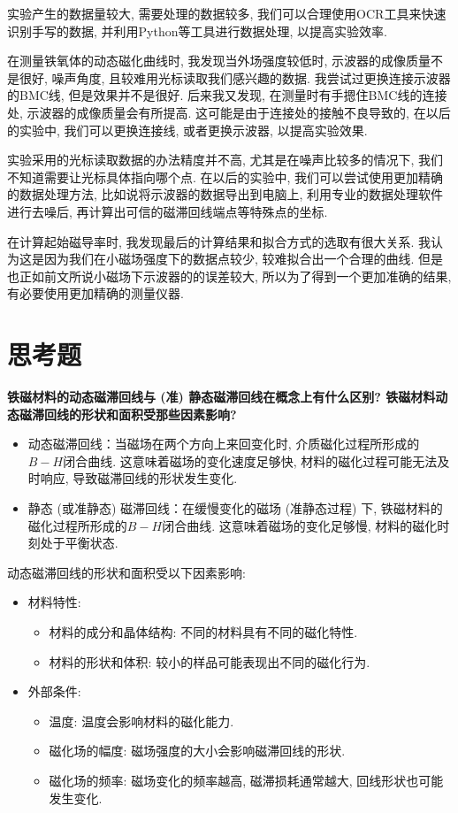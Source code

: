 \documentclass[zihao=5, UTF8]{article}
\theoremstyle{MyLineTheoremStyle} %
\theoremstyle{MyBlockTheoremStyle} %
\theoremstyle{MySubsubsectionStyle} %
\begin{document}
实验产生的数据量较大, 需要处理的数据较多, 我们可以合理使用OCR工具来快速识别手写的数据, 并利用Python等工具进行数据处理, 以提高实验效率.

在测量铁氧体的动态磁化曲线时, 我发现当外场强度较低时, 示波器的成像质量不是很好, 噪声角度, 且较难用光标读取我们感兴趣的数据. 我尝试过更换连接示波器的BMC线, 但是效果并不是很好. 后来我又发现, 在测量时有手摁住BMC线的连接处, 示波器的成像质量会有所提高. 这可能是由于连接处的接触不良导致的, 在以后的实验中, 我们可以更换连接线, 或者更换示波器, 以提高实验效果.

实验采用的光标读取数据的办法精度并不高, 尤其是在噪声比较多的情况下, 我们不知道需要让光标具体指向哪个点. 在以后的实验中, 我们可以尝试使用更加精确的数据处理方法, 比如说将示波器的数据导出到电脑上, 利用专业的数据处理软件进行去噪后, 再计算出可信的磁滞回线端点等特殊点的坐标.

在计算起始磁导率时, 我发现最后的计算结果和拟合方式的选取有很大关系. 我认为这是因为我们在小磁场强度下的数据点较少, 较难拟合出一个合理的曲线. 但是也正如前文所说小磁场下示波器的的误差较大, 所以为了得到一个更加准确的结果, 有必要使用更加精确的测量仪器.

\section{思考题}
\textbf{铁磁材料的动态磁滞回线与 (准) 静态磁滞回线在概念上有什么区别? 铁磁材料动态磁滞回线的形状和面积受那些因素影响? }
~\\
\begin{itemize}
    \item 动态磁滞回线：当磁场在两个方向上来回变化时, 介质磁化过程所形成的$B-H$闭合曲线. 这意味着磁场的变化速度足够快, 材料的磁化过程可能无法及时响应, 导致磁滞回线的形状发生变化. 
    \item 静态 (或准静态) 磁滞回线：在缓慢变化的磁场 (准静态过程) 下, 铁磁材料的磁化过程所形成的$B-H$闭合曲线. 这意味着磁场的变化足够慢, 材料的磁化时刻处于平衡状态. 
\end{itemize}
动态磁滞回线的形状和面积受以下因素影响:
\begin{itemize}
    \item 材料特性:
    \begin{itemize}
        \item 材料的成分和晶体结构: 不同的材料具有不同的磁化特性. 
        \item 材料的形状和体积: 较小的样品可能表现出不同的磁化行为. 
    \end{itemize}
    \item 外部条件:
    \begin{itemize}
        \item 温度: 温度会影响材料的磁化能力. 
        \item 磁化场的幅度: 磁场强度的大小会影响磁滞回线的形状. 
        \item 磁化场的频率: 磁场变化的频率越高, 磁滞损耗通常越大, 回线形状也可能发生变化. 
    \end{itemize}
\end{itemize}
\end{document}
